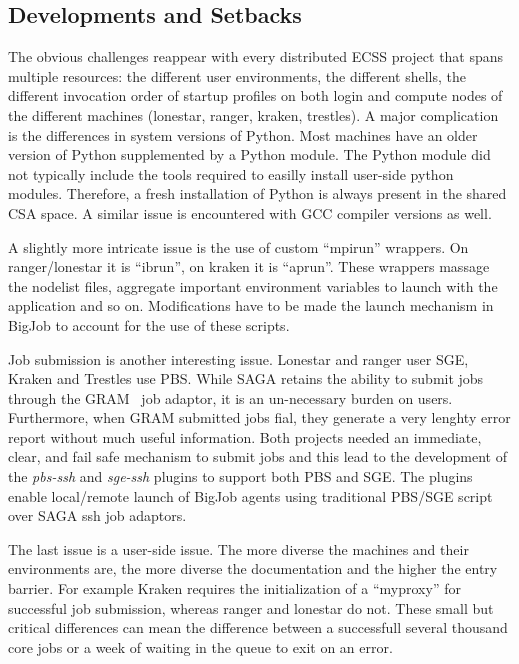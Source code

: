 \documentclass{sig-alternate}
\begin{document}
\subsection{Developments and Setbacks}

The obvious challenges reappear with every distributed ECSS project that spans
multiple resources: the different user environments, the different shells, the
different invocation order of startup profiles on both login and compute nodes
of the different machines (lonestar, ranger, kraken, trestles). A major
complication is the differences in system versions of Python. Most machines
have an older version of Python supplemented by a Python module. The Python
module did not typically include the tools required to easilly install
user-side python modules. Therefore, a fresh installation of Python is always
present in the shared CSA space. A similar issue is encountered with GCC
compiler versions as well.

A slightly more intricate issue is the use of custom ``mpirun'' wrappers. On
ranger/lonestar it is ``ibrun'', on kraken it is ``aprun''. These wrappers
massage the nodelist files, aggregate important environment variables to launch
with the application and so on. Modifications have to be made the launch
mechanism in BigJob to account for the use of these scripts.

Job submission is another interesting issue. Lonestar and ranger user SGE,
Kraken and Trestles use PBS. While SAGA retains the ability to submit jobs
through the GRAM~\cite{gram} job adaptor, it is an un-necessary burden on
users. Furthermore, when GRAM submitted jobs fial, they generate a very lenghty
error report without much useful information. Both projects needed an
immediate, clear, and fail safe mechanism to submit jobs and this lead to the
development of the \textit{pbs-ssh} and \textit{sge-ssh} plugins to support
both PBS and SGE. The plugins enable local/remote launch of BigJob agents using
traditional PBS/SGE script over SAGA ssh job adaptors.

The last issue is a user-side issue. The more diverse the machines and their
environments are, the more diverse the documentation and the higher the entry
barrier. For example Kraken requires the initialization of a ``myproxy'' for
successful job submission, whereas ranger and lonestar do not. These small  but
critical differences can mean the difference between a successfull several
thousand core jobs or a week of waiting in the queue to exit on an error.
\end{document}
